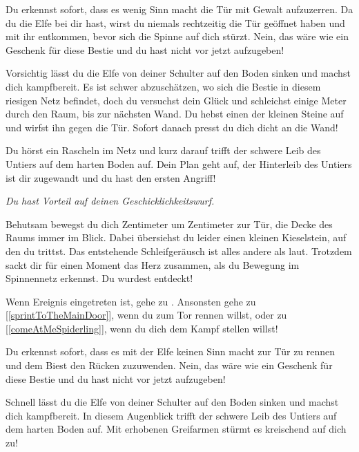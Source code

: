 Du erkennst sofort, dass es wenig Sinn macht die Tür mit Gewalt aufzuzerren. Da du die Elfe bei dir hast, wirst du niemals rechtzeitig die Tür geöffnet haben und mit ihr entkommen, bevor sich die Spinne auf dich stürzt. Nein, das wäre wie ein Geschenk für diese Bestie und du hast nicht vor jetzt aufzugeben!

Vorsichtig lässt du die Elfe von deiner Schulter auf den Boden sinken und machst dich kampfbereit. Es ist schwer abzuschätzen, wo sich die Bestie in diesem riesigen Netz befindet, doch du versuchst dein Glück und schleichst einige Meter durch den Raum, bis zur nächsten Wand. Du hebst einen der kleinen Steine auf und wirfst ihn gegen die Tür. Sofort danach presst du dich dicht an die Wand!

Du hörst ein Rascheln im Netz und kurz darauf trifft der schwere Leib des Untiers auf dem harten Boden auf. Dein Plan geht auf, der Hinterleib des Untiers ist dir zugewandt und du hast den ersten Angriff!

\textit{Du hast Vorteil auf deinen Geschicklichkeitswurf.}



Behutsam bewegst du dich Zentimeter um Zentimeter zur Tür, die Decke des Raums immer im Blick. Dabei übersiehst du leider einen kleinen Kieselstein, auf den du trittst. Das entstehende Schleifgeräusch ist alles andere als laut. Trotzdem sackt dir für einen Moment das Herz zusammen, als du Bewegung im Spinnennetz erkennst. Du wurdest entdeckt!

Wenn Ereignis  eingetreten ist, gehe zu . Ansonsten gehe zu [\ref{sprintToTheMainDoor}], wenn du zum Tor rennen willst, oder zu [\ref{comeAtMeSpiderling}], wenn du dich dem Kampf stellen willst!


Du erkennst sofort, dass es mit der Elfe keinen Sinn macht zur Tür zu rennen und dem Biest den Rücken zuzuwenden. Nein, das wäre wie ein Geschenk für diese Bestie und du hast nicht vor jetzt aufzugeben!

Schnell lässt du die Elfe von deiner Schulter auf den Boden sinken und machst dich kampfbereit. In diesem Augenblick trifft der schwere Leib des Untiers auf dem harten Boden auf. Mit erhobenen Greifarmen stürmt es kreischend auf dich zu!

